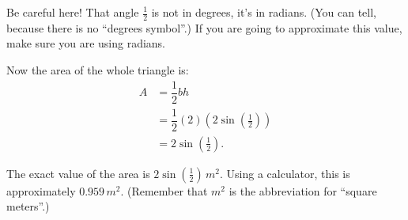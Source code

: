 \documentclass[nooutcomes]{ximera}
\begin{document}
\begin{example}
\begin{explanation}
		Be careful here! That angle $\frac{1}{2}$ is not in degrees, it's in radians. (You can tell, because there is no ``degrees symbol''.) If you are going to approximate this value, make sure you are using radians.
		
		Now the area of the whole triangle is:
		\begin{align*}
			A 	&= \dfrac{1}{2} b h\\
				&= \dfrac{1}{2} (2)\left( 2 \sin\left( \frac{1}{2} \right)\right)\\
				&= 2 \sin\left( \frac{1}{2} \right).
		\end{align*}

		The exact value of the area is $2 \sin\left( \frac{1}{2} \right) \,m^2$. Using a calculator, this is approximately $0.959\, m^2$. (Remember that $m^2$ is the abbreviation for ``square meters''.)

	\end{explanation}
\end{example}
\end{document}
